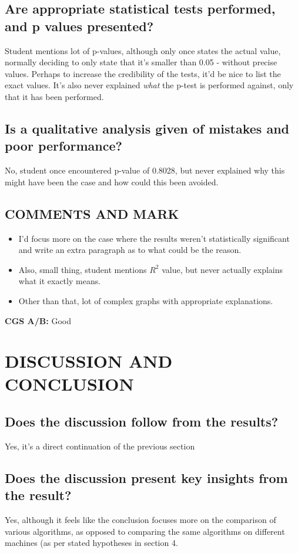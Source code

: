 \documentclass{article}
\begin{document}
\begin{normalsize}
\subsection{Are appropriate statistical tests performed, and p values presented?}
Student mentions lot of p-values, although only once states the actual value, normally deciding to only state that it's smaller than 0.05 - without precise values. Perhaps to increase the credibility of the tests, it'd be nice to list the exact values.
\bigbreak\noindent
It's also never explained \textit{what} the p-test is performed against, only that it has been performed. 
\subsection{Is a qualitative analysis given of mistakes and poor performance?}
No, student once encountered p-value of 0.8028, but never explained why this might have been the case and how could this been avoided.
\subsection{COMMENTS AND MARK}
\begin{itemize}
  \item I'd focus more on the case where the results weren't statistically significant and write an extra paragraph as to what could be the reason.
  \item Also, small thing, student mentions $R^2$ value, but never actually explains what it exactly means.
  \item Other than that, lot of complex graphs with appropriate explanations.
\end{itemize}
\textbf{CGS A/B: }Good
\section{DISCUSSION AND CONCLUSION}
\subsection{Does the discussion follow from the results?}
Yes, it's a direct continuation of the previous section
\subsection{Does the discussion present key insights from the result?}
Yes, although it feels like the conclusion focuses more on the comparison of various algorithms, as opposed to comparing the same algorithms on different machines (as per stated hypotheses in section 4.

\end{normalsize}
\end{document}
